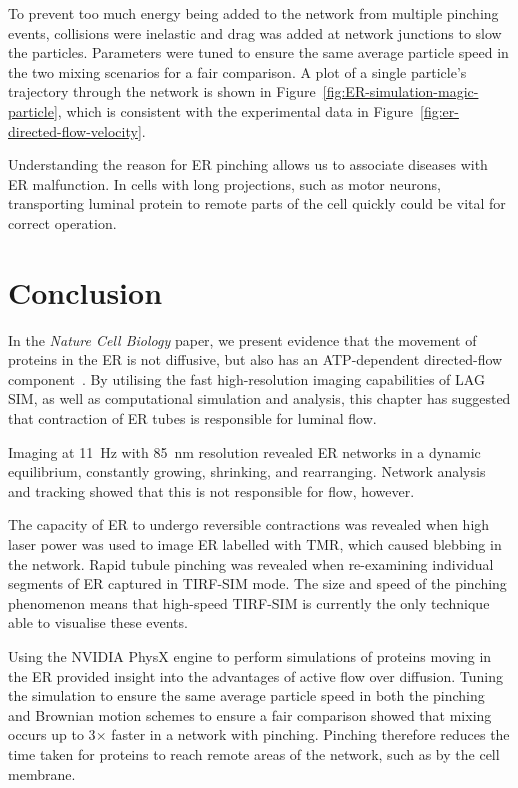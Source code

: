 To prevent too much energy being added to the network from multiple pinching events, collisions were inelastic and drag was added at network junctions to slow the particles. 
Parameters were tuned to ensure the same average particle speed in the two mixing scenarios for a fair comparison. 
A plot of a single particle's trajectory through the network is shown in Figure~\ref{fig:ER-simulation-magic-particle}, which is consistent with the experimental data in Figure~\ref{fig:er-directed-flow-velocity}. 

Understanding the reason for ER pinching allows us to associate diseases with ER malfunction. 
In cells with long projections, such as motor neurons, transporting luminal protein to remote parts of the cell quickly could be vital for correct operation. 

\section{Conclusion} 
In the \textit{Nature Cell Biology} paper, we present evidence that the movement of proteins in the ER is not diffusive, but also has an ATP-dependent directed-flow component~\cite{holcman2018single}.
By utilising the fast high-resolution imaging capabilities of LAG SIM, as well as computational simulation and analysis, this chapter has suggested that contraction of ER tubes is responsible for luminal flow. 

Imaging at \SI{11}{\hertz} with \SI{85}{\nano\metre} resolution revealed ER networks in a dynamic equilibrium, constantly growing, shrinking, and rearranging. 
Network analysis and tracking showed that this is not responsible for flow, however.

The capacity of ER to undergo reversible contractions was revealed when high laser power was used to image ER labelled with TMR, which caused blebbing in the network.
Rapid tubule pinching was revealed when re-examining individual segments of ER captured in TIRF-SIM mode. 
The size and speed of the pinching phenomenon means that high-speed TIRF-SIM is currently the only technique able to visualise these events. 

Using the NVIDIA PhysX engine to perform simulations of proteins moving in the ER provided insight into the advantages of active flow over diffusion.
Tuning the simulation to ensure the same average particle speed in both the pinching and Brownian motion schemes to ensure a fair comparison showed that mixing occurs up to 3$\times$ faster in a network with pinching.
Pinching therefore reduces the time taken for proteins to reach remote areas of the network, such as by the cell membrane. 

